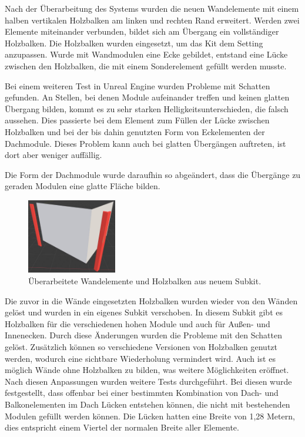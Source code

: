 Nach der Überarbeitung des Systems wurden die neuen Wandelemente mit einem halben vertikalen Holzbalken am linken und rechten Rand erweitert. Werden zwei Elemente miteinander verbunden, bildet sich am Übergang ein vollständiger Holzbalken. Die Holzbalken wurden eingesetzt, um das Kit dem Setting anzupassen. Wurde mit Wandmodulen eine Ecke gebildet, entstand eine Lücke zwischen den Holzbalken, die mit einem Sonderelement gefüllt werden musste.
\par
Bei einem weiteren Test in Unreal Engine wurden Probleme mit Schatten gefunden. An Stellen, bei denen Module aufeinander treffen und keinen glatten Übergang bilden, kommt es zu sehr starken Helligkeitsunterschieden, die falsch aussehen. Dies passierte bei dem Element zum Füllen der Lücke zwischen Holzbalken und bei der bis dahin genutzten Form von Eckelementen der Dachmodule. Dieses Problem kann auch bei glatten Übergängen auftreten, ist dort aber weniger auffällig.
\par
Die Form der Dachmodule wurde daraufhin so abgeändert, dass die Übergänge zu geraden Modulen eine glatte Fläche bilden.
\par
\begin{figure}
  \centering 
   \vspace{-11.5pt}
    \includegraphics[width=0.35\textwidth]{bilder/holzecke2}
      \caption{Überarbeitete Wandelemente und Holzbalken aus neuem Subkit.}\label{holzecke2}
          \vspace{-14pt}
\end{figure}
Die zuvor in die Wände eingesetzten Holzbalken wurden wieder von den Wänden gelöst und wurden in ein eigenes Subkit verschoben. In diesem Subkit gibt es Holzbalken für die verschiedenen hohen Module und auch für Außen- und Innenecken. Durch diese Änderungen wurden die Probleme mit den Schatten gelöst. Zusätzlich können so verschiedene Versionen von Holzbalken genutzt werden, wodurch eine sichtbare Wiederholung vermindert wird. Auch ist es möglich Wände ohne Holzbalken zu bilden, was weitere Möglichkeiten eröffnet.
\newpage
Nach diesen Anpassungen wurden weitere Tests durchgeführt. Bei diesen wurde festgestellt, dass offenbar bei einer bestimmten Kombination von Dach- und Balkonelementen im Dach Lücken entstehen können, die nicht mit bestehenden Modulen gefüllt werden können. Die Lücken hatten eine Breite von 1,28 Metern, dies entspricht einem Viertel der normalen Breite aller Elemente.
